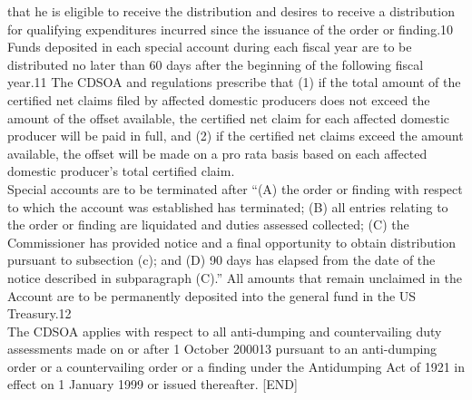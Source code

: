 \begin{tcolorbox}[breakable]
that he is eligible to receive the distribution and desires to receive a distribution for qualifying
expenditures incurred since the issuance of the order or finding.10 Funds deposited in each special
account during each fiscal year are to be distributed no later than 60 days after the beginning of the
following fiscal year.11 The CDSOA and regulations prescribe that (1) if the total amount of the
certified net claims filed by affected domestic producers does not exceed the amount of the offset
available, the certified net claim for each affected domestic producer will be paid in full, and (2) if the
certified net claims exceed the amount available, the offset will be made on a pro rata basis based on
each affected domestic producer’s total certified claim.\\

 \quad Special accounts are to be terminated after “(A) the order or finding with respect to which the
account was established has terminated; (B) all entries relating to the order or finding are liquidated
and duties assessed collected; (C) the Commissioner has provided notice and a final opportunity to
obtain distribution pursuant to subsection (c); and (D) 90 days has elapsed from the date of the notice
described in subparagraph (C).” All amounts that remain unclaimed in the Account are to be
permanently deposited into the general fund in the US Treasury.12\\

 \quad The CDSOA applies with respect to all anti-dumping and countervailing duty assessments
made on or after 1 October 200013 pursuant to an anti-dumping order or a countervailing order or a
finding under the Antidumping Act of 1921 in effect on 1 January 1999 or issued thereafter. [END]

\end{tcolorbox}